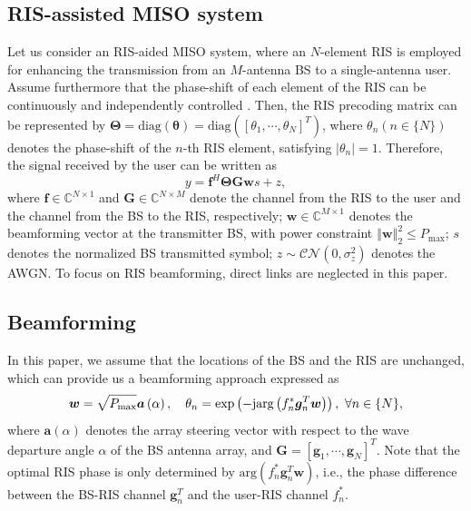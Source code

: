 \documentclass[conference,10pt,twocolumn]{IEEEtran}
\theoremstyle{nonumberplain}
\def \diag {\text{diag}}
\def \exp {\text{exp}}
\def \arg {\text{arg}}
\begin{document}
\subsection{RIS-assisted MISO system}\label{RIS-assisted MISO system}
    Let us consider an RIS-aided MISO system, where an $N$-element RIS is employed for enhancing the transmission from an $M$-antenna \ac{BS} to a single-antenna user. 
    Assume furthermore that the phase-shift of each element of the RIS can be continuously and independently controlled \cite{wu2019intelligent}. Then, the RIS precoding matrix can be represented by $\bm \Theta = \diag \left(\bm \theta\right )=\diag \left(\left[\theta_{1},\cdots ,\theta_{N}\right]^{T}\right)$,
    where $\theta_n (n\in \{N\})$ denotes the phase-shift of the $n$-th RIS element, satisfying $\lvert \theta_n\rvert=1$. Therefore, the signal received by the user can be written as 
    \begin{equation}
        \label{Signal model}
        y=\bm f^{H} \bm\Theta \bm G \bm w s+z,
    \end{equation}
    where $\bm f\in \mathbb C ^{N\times 1}$ and $\bm G \in \mathbb C^{N\times M}$ denote the channel from the RIS to the user and the channel from the BS to the RIS, respectively; $\bm w\in \mathbb C^{M\times 1}$ denotes the beamforming vector at the transmitter BS, with power constraint $\left\Vert \bm w\right \Vert_{2}^{2}\leq P_{\text{max}}$; $s$ denotes the normalized BS transmitted symbol; $z\sim \mathcal{CN}\left(0,\sigma_{z}^{2}\right)$ denotes the \ac{AWGN}. To focus on RIS beamforming, direct links are neglected in this paper. 

\subsection{Beamforming} 
    \label{Beamforming}
    In this paper, we assume that the locations of the \ac{BS} and the RIS are unchanged, which can provide us a beamforming approach expressed as
    \begin{equation}
        \label{traditional beamforming}
        \bm w=\sqrt{P_{\rm max}}\bm a\left(\alpha\right),\quad \theta_{n} = \exp\left(-{\rm j} \arg\left(f_{n}^{*}\bm g_{n}^{T}\bm w\right)\right),~\forall n\in \{N\},
    \end{equation}
    where $\bm a(\alpha)$ denotes the array steering vector with respect to the wave departure angle $\alpha$ of the BS antenna array, and $\bm G = \left[\bm g_{1}, \cdots, \bm g_{N}\right]^{T}$. Note that the optimal RIS phase is only determined by $\arg\left(f_{n}^{*}\bm g_{n}^{T}\bm w\right)$, i.e., the phase difference between the BS-RIS channel $\bm g_n^T$ and the user-RIS channel $f_n^*$. 
\end{document}
